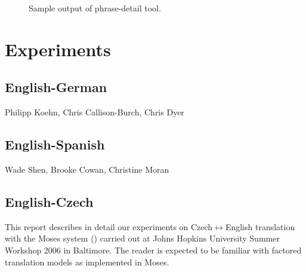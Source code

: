 \documentclass[10pt]{report}
\theoremstyle{plain}
\begin{document}
{\begin{figure}[h]
\centering
\caption{Sample output of phrase-detail tool.}
\label{fig:phrases_used_screenshot}
\end{figure}


\chapter{Experiments}

\section{English-German}
{\sc Philipp Koehn, Chris Callison-Burch, Chris Dyer}
\section{English-Spanish}
{\sc Wade Shen, Brooke Cowan, Christine Moran}

\section{English-Czech}
{  %


\def\clap#1{\hbox to 0pt{\hss #1\hss}}
\def\equo#1{``#1''}
\def\ang#1{{$\langle${#1}$\rangle$}}  %
\def\text#1{{\it{}#1}}


\def\bidir{Czech$\leftrightarrow$English}
\def\tocs{English$\rightarrow$Czech}
\def\toen{Czech$\rightarrow$English}
\def\parcite#1{(\cite{#1})}
\def\perscite#1{\cite{#1}} %

\def\max#1{{\bf{} #1}}
\def\stddev#1{{$\pm$#1}}


\def\subsubsubsection#1{\bigskip{}{\it #1\\}}


This report describes in detail our experiments on \bidir{} translation
with the Moses system \parcite{moses} carried out at Johns Hopkins University
Summer Workshop 2006 in Baltimore. The reader is expected to be
familiar with factored translation models as implemented in Moses.

}}
\end{document}
